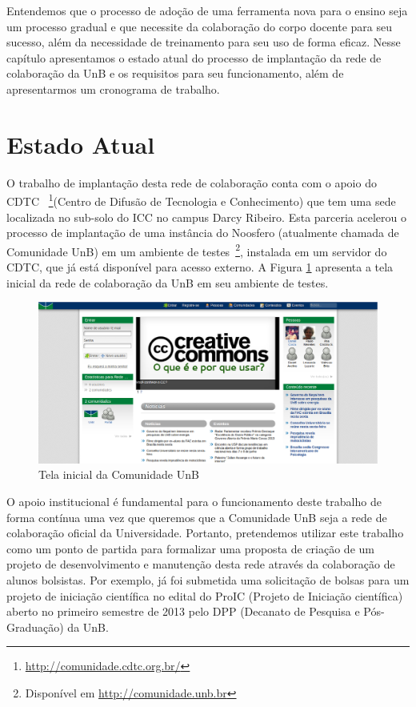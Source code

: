 Entendemos que o processo de adoção de uma ferramenta nova para o ensino seja
um processo gradual e que necessite da colaboração do corpo docente para seu
sucesso, além da necessidade de treinamento para seu uso de forma eficaz.
Nesse capítulo apresentamos o estado atual do processo de implantação da rede
de colaboração da UnB e os requisitos para seu funcionamento, além de
apresentarmos um cronograma de trabalho.


\section{Estado Atual}

O trabalho de implantação desta rede de colaboração conta com o apoio do \\ CDTC
~\footnote{\url{http://comunidade.cdtc.org.br/}}(Centro de Difusão de Tecnologia
e Conhecimento) que tem uma sede localizada no sub-solo do ICC no campus Darcy
Ribeiro. Esta parceria acelerou o processo de implantação de uma instância do
Noosfero (atualmente chamada de Comunidade UnB) em um ambiente de
testes~\footnote{Disponível em \url{http://comunidade.unb.br}}, instalada em um
servidor do CDTC, que já está disponível para acesso externo. A Figura
\ref{comunidade-unb} apresenta a tela inicial da rede de colaboração da UnB
em seu ambiente de testes.

\begin{figure}[h]
	\centering
	\includegraphics[keepaspectratio=true,scale=0.3]
	  {figuras/comunidade.unb.br.eps}
	\caption{Tela inicial da Comunidade UnB}
	\label{comunidade-unb}
\end{figure}

O apoio institucional é fundamental para o funcionamento deste trabalho de forma
contínua uma vez que queremos que a Comunidade UnB seja a rede de colaboração
oficial da Universidade. Portanto, pretendemos utilizar este trabalho como um
ponto de partida para formalizar uma proposta de criação de um projeto de
desenvolvimento e manutenção desta rede através da colaboração de alunos
bolsistas. Por exemplo, já foi submetida uma solicitação de bolsas para um projeto
de iniciação científica no edital do ProIC (Projeto de Iniciação científica)
aberto no primeiro semestre de 2013 pelo DPP (Decanato de Pesquisa e Pós-
Graduação) da UnB.

